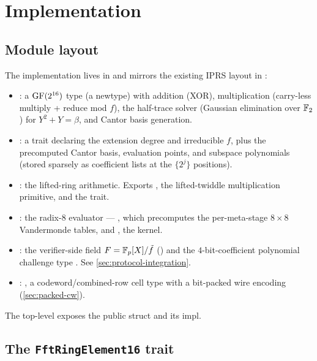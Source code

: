 \section{Implementation}
\label{sec:implementation}

\subsection{Module layout}

The implementation lives in
 and mirrors the
existing IPRS layout in :

\begin{itemize}
  \item {}: a $\operatorname{GF}(2^{16})$  type (a
     newtype) with addition (XOR), multiplication
    (carry-less multiply + reduce mod $f$), the half-trace solver
    (Gaussian elimination over $\mathbb{F}_2$) for $Y^2 + Y = \beta$, and
    Cantor basis generation.
  \item {}: a  trait declaring the
    extension degree and irreducible $f$, plus the precomputed
    Cantor basis, evaluation points, and subspace polynomials
    (stored sparsely as coefficient lists at the $\{2^j\}$
    positions).
  \item {}: the lifted-ring arithmetic. Exports
    , the lifted-twiddle
    multiplication primitive, and the  trait.
  \item {}: the radix-8 evaluator ---
    , which precomputes the per-meta-stage
    $8 \times 8$ Vandermonde tables, and ,
    the kernel.
  \item {}: the verifier-side field
    $F = \mathbb{F}_p[X]/\tilde f$ () and the
    $4$-bit-coefficient polynomial challenge type .
    See \autoref{sec:protocol-integration}.
  \item {}: , a
    codeword/combined-row cell type with a bit-packed wire encoding
    (\autoref{sec:packed-cw}).
\end{itemize}

The top-level  exposes the public
 struct and its  impl.

\subsection{The {\tt FftRingElement16} trait}
\label{sec:fft-ring-element}

